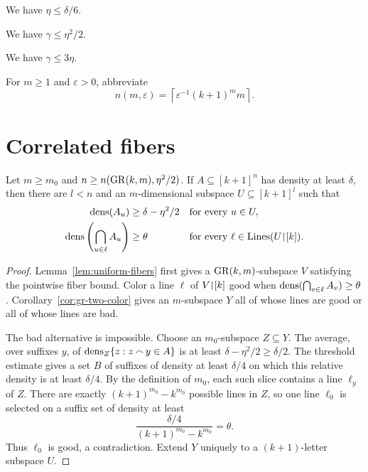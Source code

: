 \begin{lemma}
\label{lem:eta-le-delta-div-six}
We have $\eta\leq\delta/6$.
\end{lemma}

\begin{lemma}
\label{lem:gamma-le-eta-sq-div-two}
We have $\gamma\leq\eta^2/2$.
\end{lemma}

\begin{lemma}
\label{lem:gamma-le-three-eta}
We have $\gamma\leq3\eta$.
\end{lemma}

For $m\geq1$ and $\varepsilon>0$, abbreviate
\[
  n(m,\varepsilon)=\left\lceil\varepsilon^{-1}(k+1)^m m\right\rceil.
\]

\section{Correlated fibers}

\begin{lemma}
\label{lem:correlated-fibers}
Let $m\geq m_0$ and
$n\geq n(\operatorname{GR}(k,m),\eta^2/2)$.  If $A\subseteq[k+1]^n$ has density at least $\delta$, then there
are $l<n$ and an $m$-dimensional subspace $U\subseteq[k+1]^l$ such that
\begin{align*}
 \operatorname{dens}(A_u)&\geq\delta-\eta^2/2 &&\text{for every }u\in U,\\
 \operatorname{dens}\left(\bigcap_{u\in\ell}A_u\right)&\geq\theta
 &&\text{for every }\ell\in\operatorname{Lines}(U\mathord{\upharpoonright}[k]).
\end{align*}
\end{lemma}

\begin{proof}
Lemma~\ref{lem:uniform-fibers} first gives a $\operatorname{GR}(k,m)$-subspace $V$ satisfying the pointwise fiber
bound.  Color a line $\ell$ of $V\mathord{\upharpoonright}[k]$ good when
$\operatorname{dens}(\bigcap_{v\in\ell}A_v)\geq\theta$.  Corollary~\ref{cor:gr-two-color} gives an
$m$-subspace $Y$ all of whose lines are good or all of whose lines are bad.

The bad alternative is impossible.  Choose an $m_0$-subspace $Z\subseteq Y$.  The average, over
suffixes $y$, of $\operatorname{dens}_Z\{z:z\mathbin{\smallfrown} y\in A\}$ is at least $\delta-\eta^2/2\geq\delta/2$.
The threshold estimate gives a set $B$ of suffixes of density at least $\delta/4$ on which this
relative density is at least $\delta/4$.  By the definition of $m_0$, each such slice contains a
line $\ell_y$ of $Z$.  There are exactly $(k+1)^{m_0}-k^{m_0}$ possible lines in $Z$, so one line
$\ell_0$ is selected on a suffix set of density at least
\[
 \frac{\delta/4}{(k+1)^{m_0}-k^{m_0}}=\theta.
\]
Thus $\ell_0$ is good, a contradiction.  Extend $Y$ uniquely to a $(k+1)$-letter subspace $U$.
\end{proof}

